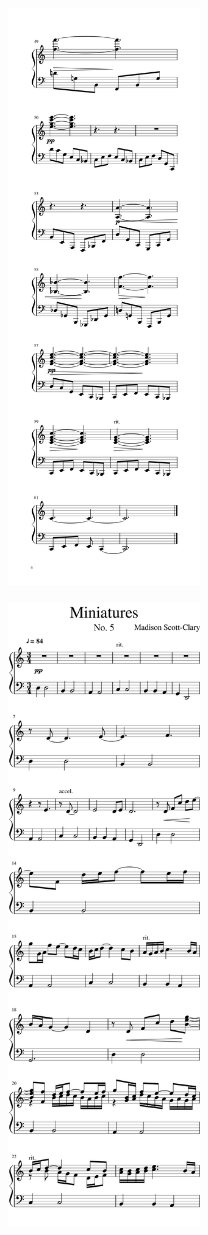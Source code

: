 \begin{paracol}{2}
\begin{rightcolumn*}
\noindent\includegraphics[width=2in]{assets/static/miniatures/4-4.png}

\noindent\includegraphics[width=2in]{assets/static/miniatures/5-1.png}


\end{rightcolumn*}
\end{paracol}

